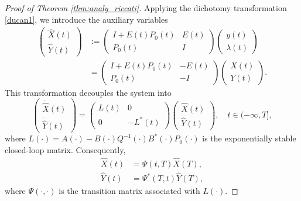 \documentclass[10pt,a4paper]{amsart}
\begin{document}
\begin{proof}[Proof of Theorem \ref{thm:analy_riccati}]
		Applying the dichotomy transformation \eqref{ducan1}, we introduce the auxiliary variables
		\begin{equation*}
			\begin{aligned}
				\begin{pmatrix} \hat{X}(t) \\ \hat{Y}(t) \end{pmatrix} &:= 
				\begin{pmatrix}
					I+E(t)P_0(t) & E(t)\\
					P_0(t) & I
				\end{pmatrix}
				\begin{pmatrix} y(t) \\ \lambda(t) \end{pmatrix}\\
				&=
				\begin{pmatrix}
					I+E(t)P_0(t) & -E(t)\\
					P_0(t) & -I
				\end{pmatrix}
				\begin{pmatrix} X(t) \\ Y(t) \end{pmatrix}.
			\end{aligned}
		\end{equation*}
		This transformation decouples the system into
		\begin{equation*}
			\begin{pmatrix} \dot{\hat{X}}(t)\\ \dot{\hat{Y}}(t) \end{pmatrix}
			=
			\begin{pmatrix}
				L(t) & 0 \\
				0 & -L^*(t)
			\end{pmatrix}
			\begin{pmatrix} \hat{X}(t)\\ \hat{Y}(t) \end{pmatrix},\quad t\in(-\infty,T],
		\end{equation*}
		where $L(\cdot)=A(\cdot)-B(\cdot)Q^{-1}(\cdot)B^*(\cdot)P_0(\cdot)$ is the exponentially stable closed-loop matrix. Consequently,
		\begin{equation}
			\begin{aligned}
				\hat{X}(t) &= \Psi(t,T)\hat{X}(T), \\
				\hat{Y}(t) &= \Psi^*(T,t)\hat{Y}(T),
			\end{aligned}
		\end{equation}
		where $\Psi(\cdot,\cdot)$ is the transition matrix associated with $L(\cdot)$. 
		

\end{proof}
\end{document}
